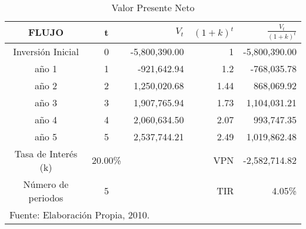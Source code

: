 \begin{table}
    \caption{Valor Presente Neto}
    \label{tbl:VPN}
    \centering
    \begin{tabular}{c|c|r|r|r}
        FLUJO               & t & $V_t$         & $\left(1+k\right)^t$ & $\frac{V_t}{\left(1+k\right)^t}$ \\
        \hline
        \hline
        Inversión Inicial   & 0 & -5,800,390.00 & 1                    &  -5,800,390.00                   \\
        \hline
        año 1               & 1 & -921,642.94   & 1.2                  &  -768,035.78                     \\
        año 2               & 2 & 1,250,020.68  & 1.44                 &  868,069.92                      \\
        año 3               & 3 & 1,907,765.94  & 1.73                 &  1,104,031.21                    \\
        año 4               & 4 & 2,060,634.50  & 2.07                 &  993,747.35                      \\
        año 5               & 5 & 2,537,744.21  & 2.49                 &  1,019,862.48                    \\
        \hline
        Tasa de Interés (k) &  20.00\% &        & VPN                  &  -2,582,714.82                   \\
        Número de periodos  & 5 &               & TIR                  &  4.05\%                          \\
        \hline
        \multicolumn{5}{l}{\footnotesize Fuente: Elaboración Propia, 2010.}
    \end{tabular}
\end{table}










